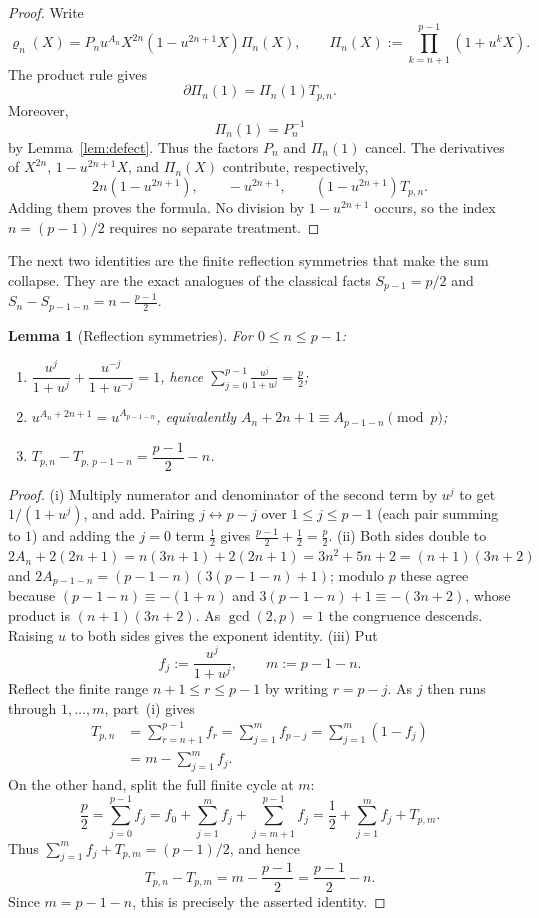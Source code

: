 \documentclass[11pt]{article}
\newtheorem{lemma}[theorem]{Lemma}
\theoremstyle{definition}
\begin{document}
\begin{proof}
Write
\[
  \varrho_n(X)
  =
  P_nu^{A_n}X^{2n}
  (1-u^{2n+1}X)\Pi_n(X),
  \qquad
  \Pi_n(X):=
  \prod_{k=n+1}^{p-1}(1+u^kX).
\]
The product rule gives
\[
  \partial\Pi_n(1)=\Pi_n(1)T_{p,n}.
\]
Moreover,
\[
  \Pi_n(1)=P_n^{-1}
\]
by Lemma~\ref{lem:defect}. Thus the factors $P_n$ and $\Pi_n(1)$ cancel. The derivatives of
$X^{2n}$, $1-u^{2n+1}X$, and $\Pi_n(X)$ contribute, respectively,
\[
  2n(1-u^{2n+1}),
  \qquad
  -u^{2n+1},
  \qquad
  (1-u^{2n+1})T_{p,n}.
\]
Adding them proves the formula. No division by
$1-u^{2n+1}$ occurs, so the index $n=(p-1)/2$ requires no separate treatment.
\end{proof}

The next two identities are the finite reflection symmetries that make the sum collapse. They are the exact analogues of the classical facts $S_{p-1}=p/2$ and $S_n-S_{p-1-n}=n-\tfrac{p-1}{2}$.

\begin{lemma}[Reflection symmetries]\label{lem:reflection}
For $0\le n\le p-1$:
\begin{enumerate}[leftmargin=2em,label=\textup{(\roman*)}]
  \item $\dfrac{u^{j}}{1+u^{j}}+\dfrac{u^{-j}}{1+u^{-j}}=1$, hence $\displaystyle\sum_{j=0}^{p-1}\frac{u^{j}}{1+u^{j}}=\frac p2$;
  \item $u^{A_n+2n+1}=u^{A_{p-1-n}}$, equivalently $A_n+2n+1\equiv A_{p-1-n}\pmod p$;
  \item $T_{p,n}-T_{p,\,p-1-n}=\dfrac{p-1}{2}-n$.
\end{enumerate}
\end{lemma}

\begin{proof}
(i) Multiply numerator and denominator of the second term by $u^{j}$ to get $1/(1+u^{j})$, and add. Pairing $j\leftrightarrow p-j$ over $1\le j\le p-1$ (each pair summing to $1$) and adding the $j=0$ term $\tfrac12$ gives $\tfrac{p-1}{2}+\tfrac12=\tfrac p2$.
(ii) Both sides double to $2A_n+2(2n+1)=n(3n+1)+2(2n+1)=3n^2+5n+2=(n{+}1)(3n{+}2)$ and $2A_{p-1-n}=(p-1-n)(3(p-1-n)+1)$; modulo $p$ these agree because $(p-1-n)\equiv-(1+n)$ and $3(p-1-n)+1\equiv-(3n+2)$, whose product is $(n{+}1)(3n{+}2)$. As $\gcd(2,p)=1$ the congruence descends. Raising $u$ to both sides gives the exponent identity.
(iii) Put
\[
  f_j:=\frac{u^j}{1+u^j},
  \qquad m:=p-1-n.
\]
Reflect the finite range $n+1\le r\le p-1$ by writing $r=p-j$.
As $j$ then runs through $1,\dots,m$, part~(i) gives
\begin{align*}
  T_{p,n}
  &=\sum_{r=n+1}^{p-1}f_r
    =\sum_{j=1}^{m}f_{p-j}
    =\sum_{j=1}^{m}(1-f_j)\\
  &=m-\sum_{j=1}^{m}f_j.
\end{align*}
On the other hand, split the full finite cycle at $m$:
\[
  \frac p2
  =\sum_{j=0}^{p-1}f_j
  =f_0+\sum_{j=1}^{m}f_j+\sum_{j=m+1}^{p-1}f_j
  =\frac12+\sum_{j=1}^{m}f_j+T_{p,m}.
\]
Thus $\sum_{j=1}^{m}f_j+T_{p,m}=(p-1)/2$, and hence
\[
  T_{p,n}-T_{p,m}
  =m-\frac{p-1}{2}
  =\frac{p-1}{2}-n.
\]
Since $m=p-1-n$, this is precisely the asserted identity.
\end{proof}
\end{document}

